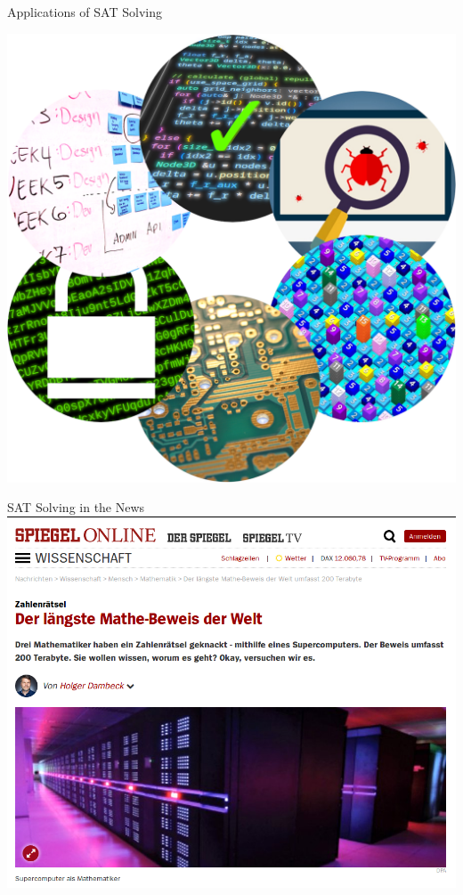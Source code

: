 \documentclass[t]{sdqbeamer}
\begin{document}
\begin{frame}{Applications of SAT Solving}
\begin{minipage}{0.28\textwidth}
	\includegraphics[width=\textwidth]{figures/l01/applications.png}
\end{minipage}
\end{frame}

\begin{frame}{SAT Solving in the News}
	\centering
	\includegraphics[height=.75\textheight]{figures/l01/triples-spiegel.png}
\end{frame}
\end{document}
